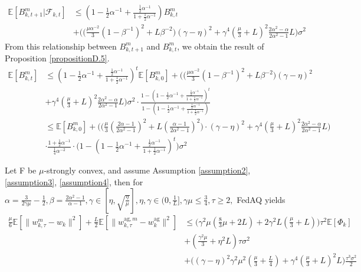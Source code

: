 \begin{align*}
    \mathbb{E}[B_{k, t+1}^m|\mathcal{F}_{k, t}] &\leq (1-\frac{1}{2}\alpha^{-1}+\frac{\frac{1}{2}\alpha^{-1}}{1+\frac{1}{2}\alpha^{-1}})B_{k, t}^m \\
    &+ \bigg(\Big(\frac{\mu\alpha^{-2}}{3}(1-\beta^{-1})^2 + L\beta^{-2}\Big)(\gamma-\eta)^2+\gamma^4(\frac{\mu}{3}+L)^2\frac{2\alpha^2-\alpha}{2\alpha^2-1}L\bigg)\sigma^2
\end{align*}
From this relationship between $B_{k, t+1}^m$ and $B_{k, t}^m$, we obtain the result of Proposition \ref{propositionD.5}.
\begin{align*}
    \mathbb{E}[B_{k, t}^m] &\leq (1-\frac{1}{2}\alpha^{-1}+\frac{\frac{1}{2}\alpha^{-1}}{1+\frac{1}{2}\alpha^{-1}})^t\mathbb{E}[B_{k, 0}^m] + \bigg(\Big(\frac{\mu\alpha^{-2}}{3}(1-\beta^{-1})^2 + L\beta^{-2}\Big)(\gamma-\eta)^2 \\
    &+\gamma^4(\frac{\mu}{3}+L)^2\frac{2\alpha^2-\alpha}{2\alpha^2-1}L\bigg)\sigma^2 \cdot \frac{1-(1-\frac{1}{2}\alpha^{-1}+\frac{\frac{1}{2}\alpha^{-1}}{1+\frac{1}{2}\alpha^{-1}})^t}{1-(1-\frac{1}{2}\alpha^{-1}+\frac{\frac{1}{2}\alpha^{-1}}{1+\frac{1}{2}\alpha^{-1}})} \\
    &\leq \mathbb{E}[B_{k, 0}^m] + \bigg( \Big(\frac{\mu}{3} (\frac{2\alpha-1}{2\alpha^2 -1})^2 + L(\frac{\alpha-1}{2\alpha^2 -1})^2 \Big)\cdot(\gamma - \eta)^2+ \gamma^4 (\frac{\mu}{3} + L)^2 \frac{2\alpha^2 - \alpha}{2\alpha^2 - 1}L \bigg) \\
    &\cdot \frac{1 + \frac{1}{2}\alpha^{-1}}{\frac{1}{4}\alpha^{-2}} \cdot \Big( 1-(1-\frac{1}{2}\alpha^{-1}+\frac{\frac{1}{2}\alpha^{-1}}{1+\frac{1}{2}\alpha^{-1}})^t\Big)\sigma^2
\end{align*}

\begin{proposition} \label{propositionD.6}
Let F be $\mu$-strongly convex, and assume Assumption \ref{assumption2}, \ref{assumption3}, \ref{assumption4}, then for $\alpha=\frac{3}{2\gamma\mu} - \frac{1}{2}, \beta=\frac{2\alpha^2-1}{\alpha-1}, \gamma \in [\eta, \sqrt{\frac{\eta}{\mu}}], \eta, \gamma \in (0, \frac{1}{L}], \gamma\mu \leq \frac{3}{4},\tau \geq 2,$ FedAQ yields
\begin{align*}
    \frac{\mu}{6}\mathbb{E}[\|w_{k, \tau}^m - w_k\|^2] + \frac{L}{2} \mathbb{E}[\|w_{k, \tau}^{\textrm{ag}, m} - w_k^{\textrm{ag}}\|^2] &\leq \Big( \gamma^2\mu(\frac{8}{3}\mu + 2L) + 2\gamma^2L(\frac{\mu}{3}+L)\Big)\tau^2 \mathbb{E}[\Phi_k] \\
    &+ (\frac{\gamma^2\mu}{3}+\eta^2 L)\tau\sigma^2 \\
    &+ \Big( (\gamma-\eta)^2\gamma^2\mu^2(\frac{\mu}{3}+\frac{L}{4})+\gamma^4(\frac{\mu}{3}+L)^2 L \Big) \frac{\tau^3\sigma^2}{2}
\end{align*}
\end{proposition}

